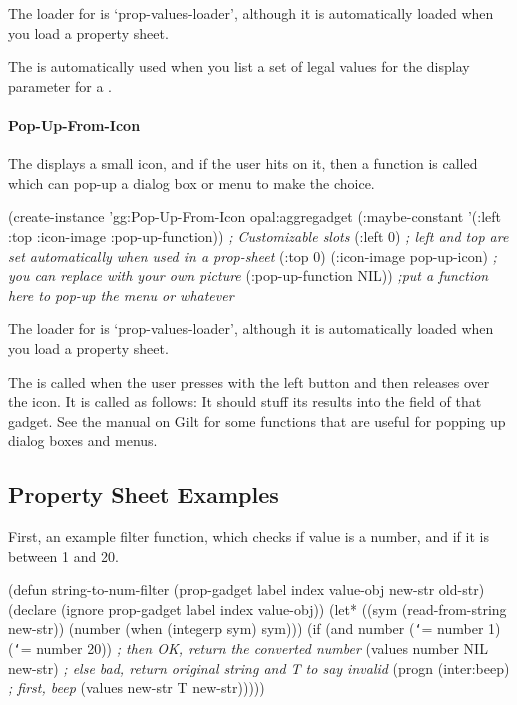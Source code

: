 The loader for  is `prop-values-loader',
although it is automatically loaded when you load a property sheet.

The  is automatically used when you list a set
of legal values for the display parameter for a
.

\paragraph{Pop-Up-From-Icon}
The  displays a small icon, and if the user hits
on it, then a function is called which can pop-up a dialog box or
menu to make the choice.

\begin{programexample}
(create-instance 'gg:Pop-Up-From-Icon opal:aggregadget
  (:maybe-constant '(:left :top :icon-image :pop-up-function))
  {\it ; Customizable slots}
  (:left 0) {\it ; left and top are set automatically when used in a prop-sheet}
  (:top 0)
  (:icon-image pop-up-icon) {\it ; you can replace with your own picture}
  (:pop-up-function NIL))   {\it ;put a function here to pop-up the menu or whatever}
\end{programexample}

The loader for  is `prop-values-loader',
although it is automatically loaded when you load a property sheet.

The  is called when the user presses with the left
button and then releases over the icon.  It is called as follows:
It should stuff its results into the  field of that gadget.
See the manual on Gilt for some functions that are useful for popping
up dialog boxes and menus.

\subsection{Property Sheet Examples}
\label{propexample}

First, an example filter function, which checks if value is a number,
and if it is between 1 and 20.
\begin{programexample}
(defun string-to-num-filter (prop-gadget label index value-obj new-str old-str)
  (declare (ignore prop-gadget label index value-obj))
  (let* ((sym (read-from-string new-str))
	 (number (when (integerp sym) sym)))
    (if (and number ({\tt\char`\>}= number 1) ({\tt\char`\<}= number 20))
	{\it ; then OK, return the converted number}
	(values number NIL new-str)
	{\it ; else bad, return original string and T to say invalid}
	(progn
	  (inter:beep) {\it ; first, beep}
	  (values new-str T new-str)))))
\end{programexample}


